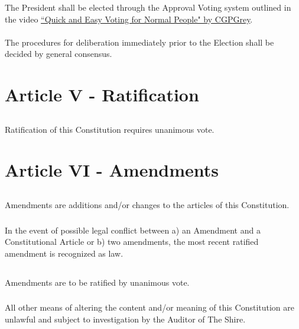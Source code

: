 \documentclass[]{article}
\begin{document}
\subsubsection{}
The President shall be elected through the Approval Voting system outlined in the video \href{https://www.youtube.com/watch?v=orybDrUj4vA}{``Quick and Easy Voting for Normal People" by CGPGrey}.
\paragraph{}
The procedures for deliberation immediately prior to the Election shall be decided by general consensus.

\section{Article V - Ratification}
\subsection{}
Ratification of this Constitution requires unanimous vote.

\section{Article VI - Amendments}
\subsection{}
Amendments are additions and/or changes to the articles of this Constitution.
\subsubsection{}
In the event of possible legal conflict between a) an Amendment and a Constitutional Article or b) two amendments, the most recent ratified amendment is recognized as law.
\subsection{}
Amendments are to be ratified by unanimous vote.
\subsubsection{}
All other means of altering the content and/or meaning of this Constitution are unlawful and subject to investigation by the Auditor of The Shire.
\end{document}
